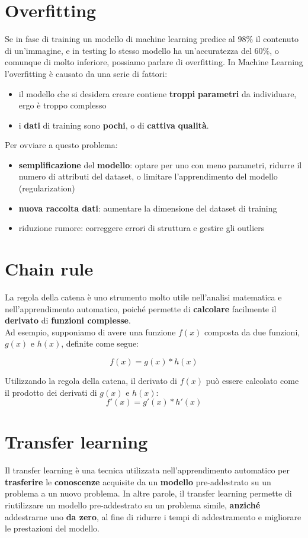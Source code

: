 \documentclass{article}
\begin{document}
\section{Overfitting}
Se in fase di training un modello di machine learning predice al $98\%$ il contenuto di un’immagine, e in testing lo stesso modello ha un’accuratezza del $60\%$, o comunque di molto inferiore, possiamo parlare di overfitting.
In Machine Learning l’overfitting è causato da una serie di fattori:
\begin{itemize}
    \item il modello che si desidera creare contiene \textbf{troppi} \textbf{parametri} da individuare, ergo è troppo complesso
    \item i \textbf{dati} di training sono \textbf{pochi}, o di \textbf{cattiva} \textbf{qualità}.
\end{itemize}
Per ovviare a questo problema:
\begin{itemize}
    \item \textbf{semplificazione} del \textbf{modello}: optare per uno con meno parametri, ridurre il numero di attributi del dataset, o limitare l’apprendimento del modello (regularization)
    \item \textbf{nuova raccolta dati}: aumentare la dimensione del dataset di training
    \item riduzione rumore: correggere errori di struttura e gestire gli outliers
\end{itemize}


\section{Chain rule}
La regola della catena è uno strumento molto utile nell'analisi matematica e nell'apprendimento automatico, poiché permette di \textbf{calcolare} facilmente il \textbf{derivato} di \textbf{funzioni complesse}. \\
Ad esempio, supponiamo di avere una funzione $f(x)$ composta da due funzioni, $g(x)$ e $h(x)$, definite come segue:

$$f(x) = g(x) * h(x)$$

Utilizzando la regola della catena, il derivato di $f(x)$ può essere calcolato come il prodotto dei derivati di $g(x)$ e $h(x)$:
$$f'(x) = g'(x) * h'(x)$$


\section{Transfer learning}
Il transfer learning è una tecnica utilizzata nell'apprendimento automatico per \textbf{trasferire} le \textbf{conoscenze} acquisite da un \textbf{modello} pre-addestrato su un problema a un nuovo problema. In altre parole, il transfer learning permette di riutilizzare un modello pre-addestrato su un problema simile, \textbf{anziché} addestrarne uno \textbf{da zero}, al fine di ridurre i tempi di addestramento e migliorare le prestazioni del modello.
\end{document}
